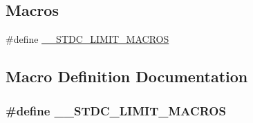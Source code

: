 \subsection*{Macros}
\begin{DoxyCompactItemize}
\item 
\#define \hyperlink{byte-tag-list_8h_aeb7e7a856ab7a794b05b6b63ef36ea3e}{\+\_\+\+\_\+\+S\+T\+D\+C\+\_\+\+L\+I\+M\+I\+T\+\_\+\+M\+A\+C\+R\+OS}
\end{DoxyCompactItemize}


\subsection{Macro Definition Documentation}
\subsubsection[{\texorpdfstring{\+\_\+\+\_\+\+S\+T\+D\+C\+\_\+\+L\+I\+M\+I\+T\+\_\+\+M\+A\+C\+R\+OS}{__STDC_LIMIT_MACROS}}]{\setlength{\rightskip}{0pt plus 5cm}\#define \+\_\+\+\_\+\+S\+T\+D\+C\+\_\+\+L\+I\+M\+I\+T\+\_\+\+M\+A\+C\+R\+OS}\hypertarget{byte-tag-list_8h_aeb7e7a856ab7a794b05b6b63ef36ea3e}{}\label{byte-tag-list_8h_aeb7e7a856ab7a794b05b6b63ef36ea3e}
